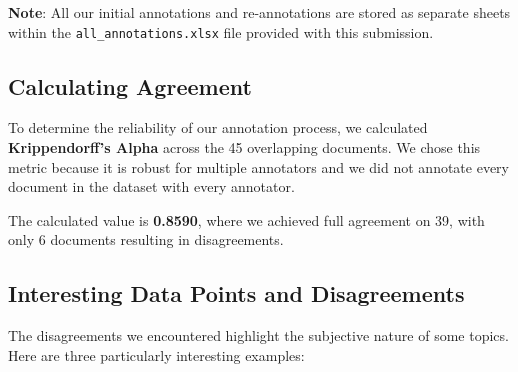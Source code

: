 \documentclass{article}
\begin{document}
\textbf{Note}: All our initial annotations and re-annotations are stored as separate sheets within the \texttt{all\_annotations.xlsx} file provided with this submission.

\subsection{Calculating Agreement}
To determine the reliability of our annotation process, we calculated \textbf{Krippendorff's Alpha} across the 45 overlapping documents. We chose this metric because it is robust for multiple annotators and we did not annotate every document in the dataset with every annotator.

The calculated value is \textbf{0.8590}, where we achieved full agreement on 39, with only 6 documents resulting in disagreements.

\subsection{Interesting Data Points and Disagreements}
The disagreements we encountered highlight the subjective nature of some topics. Here are three particularly interesting examples:
\end{document}
